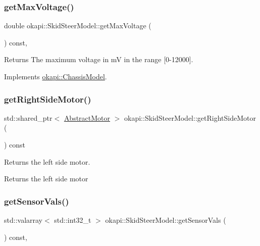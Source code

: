 \subsubsection{\texorpdfstring{getMaxVoltage()}{getMaxVoltage()}}
{\footnotesize\ttfamily double okapi\+::\+Skid\+Steer\+Model\+::get\+Max\+Voltage (\begin{DoxyParamCaption}{ }\end{DoxyParamCaption}) const\hspace{0.3cm}{\ttfamily [override]}, {\ttfamily [virtual]}}

\begin{DoxyReturn}{Returns}
The maximum voltage in mV in the range {\ttfamily \mbox{[}0-\/12000\mbox{]}}. 
\end{DoxyReturn}


Implements \mbox{\hyperlink{classokapi_1_1ChassisModel_a3ced2121524ae523592db64733c69472}{okapi\+::\+Chassis\+Model}}.

\mbox{\label{classokapi_1_1SkidSteerModel_a0c58a580708b864d8c4391c7045e590b}} 
\subsubsection{\texorpdfstring{getRightSideMotor()}{getRightSideMotor()}}
{\footnotesize\ttfamily std\+::shared\+\_\+ptr$<$ \mbox{\hyperlink{classokapi_1_1AbstractMotor}{Abstract\+Motor}} $>$ okapi\+::\+Skid\+Steer\+Model\+::get\+Right\+Side\+Motor (\begin{DoxyParamCaption}{ }\end{DoxyParamCaption}) const}

Returns the left side motor.

\begin{DoxyReturn}{Returns}
the left side motor 
\end{DoxyReturn}
\mbox{\label{classokapi_1_1SkidSteerModel_a850e4de7ab3a30a354ac39f30a1e8603}} 
\subsubsection{\texorpdfstring{getSensorVals()}{getSensorVals()}}
{\footnotesize\ttfamily std\+::valarray$<$ std\+::int32\+\_\+t $>$ okapi\+::\+Skid\+Steer\+Model\+::get\+Sensor\+Vals (\begin{DoxyParamCaption}{ }\end{DoxyParamCaption}) const\hspace{0.3cm}{\ttfamily [override]}, {\ttfamily [virtual]}}

